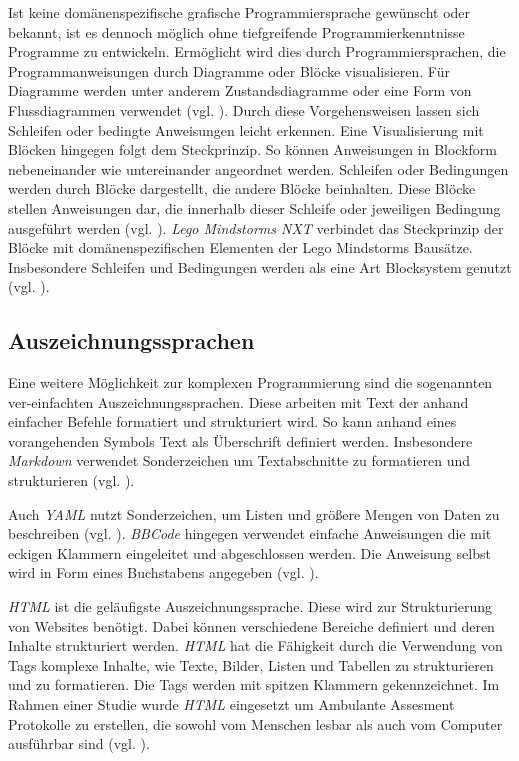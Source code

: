 Ist keine domänenspezifische grafische Programmiersprache gewünscht oder bekannt, ist es dennoch möglich ohne tiefgreifende Programmierkenntnisse Programme zu entwickeln. Ermöglicht wird dies durch Programmiersprachen, die Programmanweisungen durch Diagramme oder Blöcke visualisieren. Für Diagramme werden unter anderem Zustandsdiagramme oder eine Form von Flussdiagrammen verwendet (vgl. \cite{SwissEdu45:online} \cite{DRAKONEd12:online} \cite{PureData15:online}). Durch diese Vorgehensweisen lassen sich Schleifen oder bedingte Anweisungen leicht erkennen. Eine Visualisierung mit Blöcken hingegen folgt dem Steckprinzip. So können Anweisungen in Blockform nebeneinander wie untereinander angeordnet werden. Schleifen oder Bedingungen werden durch Blöcke dargestellt, die andere Blöcke beinhalten. Diese Blöcke stellen Anweisungen dar, die innerhalb dieser Schleife oder jeweiligen Bedingung ausgeführt werden (vgl. \cite{BlocklyG18:online} \cite{NXTSoftw71:online} \cite{SnapBuil34:online} \cite{squeakla50:online}). \emph{Lego Mindstorms NXT} verbindet das Steckprinzip der Blöcke mit domänenspezifischen Elementen der Lego Mindstorms Bausätze. Insbesondere Schleifen und Bedingungen werden als eine Art Blocksystem genutzt (vgl. \cite{NXTSoftw71:online}).


\subsection{Auszeichnungssprachen}
Eine weitere Möglichkeit zur komplexen Programmierung sind die sogenannten ver-einfachten Auszeichnungssprachen. Diese arbeiten mit Text der anhand einfacher Befehle formatiert und strukturiert wird. So kann anhand eines vorangehenden Symbols Text als Überschrift definiert werden. Insbesondere \emph{Markdown} verwendet Sonderzeichen um Textabschnitte zu formatieren und strukturieren (vgl. \cite{GettingS56:online}).

Auch \emph{YAML} nutzt Sonderzeichen, um Listen und größere Mengen von Daten zu beschreiben (vgl. \cite{TheOffic64:online}). \emph{BBCode} hingegen verwendet einfache Anweisungen die mit eckigen Klammern eingeleitet und abgeschlossen werden. Die Anweisung selbst wird in Form eines Buchstabens angegeben (vgl. \cite{BBCodeor24:online}).

\emph{HTML} ist die geläufigste Auszeichnungssprache. Diese wird zur Strukturierung von Websites benötigt. Dabei können verschiedene Bereiche definiert und deren Inhalte strukturiert werden. \emph{HTML} hat die Fähigkeit durch die Verwendung von Tags komplexe Inhalte, wie Texte, Bilder, Listen und Tabellen zu strukturieren und zu formatieren. Die Tags werden mit spitzen Klammern gekennzeichnet. Im Rahmen einer Studie wurde \emph{HTML} eingesetzt um Ambulante Assesment Protokolle zu erstellen, die sowohl vom Menschen lesbar als auch vom Computer ausführbar sind (vgl. \cite{Batalas2018}).



